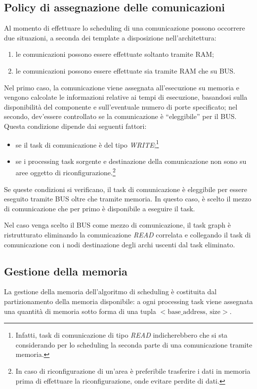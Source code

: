 \subsection{Policy di assegnazione delle comunicazioni}
\label{subsec:policyComunicazioni}
Al momento di effettuare lo scheduling di una comunicazione possono occorrere
due situazioni, a seconda dei template a disposizione nell'architettura:
\begin{enumerate}
 \item le comunicazioni possono essere effettuate soltanto tramite \acs{RAM};
 \item le comunicazioni possono essere effettuate sia tramite \acs{RAM} che su 
BUS.
\end{enumerate}
Nel primo caso, la comunicazione viene assegnata all'esecuzione su 
memoria e vengono calcolate le informazioni relative ai tempi di esecuzione, 
basandosi sulla disponibilità del componente e sull'eventuale numero di porte 
specificato; nel secondo, dev'essere controllato se la comunicazione è ``eleggibile'' 
per il BUS. Questa condizione dipende dai seguenti fattori:
\begin{itemize}
 \item se il task di comunicazione è del tipo \emph{WRITE};\footnote{Infatti, 
task di comunicazione di tipo \emph{READ} indicherebbero che si sta 
considerando per lo scheduling la seconda parte di una comunicazione tramite 
memoria.}
 \item se i processing task sorgente e destinazione della comunicazione non 
sono su aree oggetto di riconfigurazione.\footnote{In caso di riconfigurazione 
di un'area è preferibile trasferire i dati in memoria prima di 
effettuare la riconfigurazione, onde evitare perdite di dati.}
\end{itemize}
Se queste condizioni si verificano, il task di comunicazione è eleggibile per 
essere eseguito tramite BUS oltre che tramite memoria. In questo caso, è scelto 
il mezzo di comunicazione che per primo è disponibile a eseguire il task.

Nel caso venga scelto il BUS come mezzo di comunicazione, il task graph è 
ristrutturato eliminando la comunicazione \emph{READ} correlata e collegando 
il task di comunicazione con i nodi destinazione degli archi uscenti dal task 
eliminato.


\subsection{Gestione della memoria}
\label{sec:gestioneMemoria}
La gestione della memoria dell'algoritmo di scheduling è costituita dal 
partizionamento della memoria disponibile: a ogni processing task viene 
assegnata una quantità di memoria sotto forma di una tupla 
$<\text{base\_address, size}>$.

